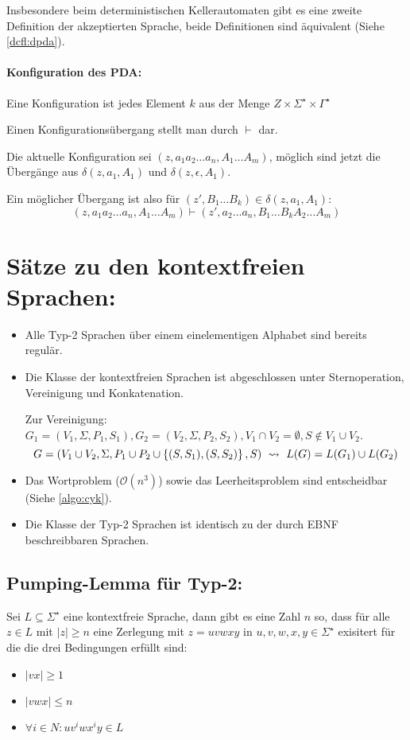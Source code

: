 Insbesondere beim deterministischen Kellerautomaten gibt es eine zweite Definition der akzeptierten Sprache, beide Definitionen sind äquivalent (Siehe \autoref{dcfl:dpda}).

\paragraph{Konfiguration des PDA: }
Eine Konfiguration ist jedes Element $k$ aus der Menge $Z\times\Sigma^\star\times\Gamma^\star$

Einen Konfigurationsübergang stellt man durch $\vdash$ dar.

Die aktuelle Konfiguration sei $(z,a_1a_2\ldots a_n,A_1\ldots A_m)$, möglich sind jetzt die Übergänge aus $\delta(z,a_1,A_1)$ und $\delta(z,\epsilon,A_1)$.

Ein möglicher Übergang ist also für $(z',B_1\ldots B_k)\in\delta(z,a_1,A_1)$:
\begin{equation*}
	(z,a_1a_2\ldots a_n,A_1\ldots A_m)\vdash (z',a_2\ldots a_n,B_1\ldots B_kA_2\ldots A_m)
\end{equation*}



\section{Sätze zu den kontextfreien Sprachen:}
\begin{itemize}
	\item Alle Typ-2 Sprachen über einem einelementigen Alphabet sind bereits regulär.
	\item Die Klasse der kontextfreien Sprachen ist abgeschlossen unter Sternoperation, Vereinigung und Konkatenation.

	Zur Vereinigung: $G_1=(V_1,\Sigma, P_1,S_1), G_2=(V_2,\Sigma, P_2,S_2), V_1\cap V_2=\emptyset, S\not\in V_1\cup V_2$.
	\begin{equation*}
		G=(V_1\cup V_2, \Sigma, P_1\cup P_2\cup\simpleset{(S,S_1),(S,S_2)},S) \ \rightsquigarrow\  L(G)=L(G_1)\cup L(G_2)
	\end{equation*}
	\item Das Wortproblem ($\mathcal O(n^3)$) sowie das Leerheitsproblem sind entscheidbar (Siehe \autoref{algo:cyk}).
	\item Die Klasse der Typ-2 Sprachen ist identisch zu der durch EBNF beschreibbaren Sprachen.
\end{itemize}
\subsection{Pumping-Lemma für Typ-2:}
Sei $L\subseteq \Sigma^\star$ eine kontextfreie Sprache, dann gibt es eine Zahl $n$ so, dass für alle $z\in L$ mit $|z|\geq n$ eine Zerlegung mit $z=uvwxy$ in $u,v,w,x,y\in\Sigma^\star$ exisitert für die die drei Bedingungen erfüllt sind:
\begin{itemize}
	\item $|vx|\geq 1$
	\item $|vwx|\leq n$
	\item $\forall i\in N: uv^iwx^iy\in L$
\end{itemize}


